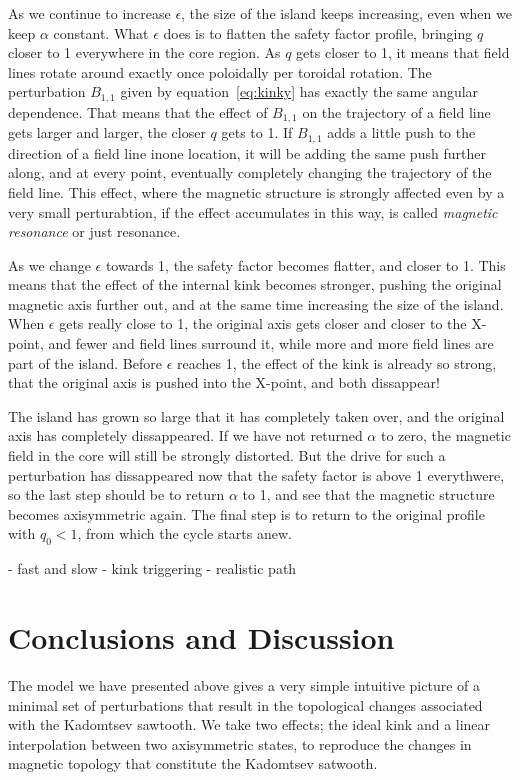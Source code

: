 \documentclass[%
superscriptaddress,
amsmath,amssymb,
aps,
pre,
floatfix,
]{revtex4-2}
\begin{document}
As we continue to increase  $\epsilon$, the size of the island keeps increasing, even when we keep $\alpha$ constant. 
What $\epsilon$ does is to flatten the safety factor profile, bringing $q$ closer to 1 everywhere in the core region.
As $q$ gets closer to 1, it means that field lines rotate around exactly once poloidally per toroidal rotation. 
The perturbation $B_{1,1}$ given by equation~\eqref{eq:kinky} has exactly the same angular dependence. 
That means that the effect of $B_{1,1}$ on the trajectory of a field line gets larger and larger, the closer $q$ gets to 1. 
If $B_{1,1}$ adds a little push to the direction of a field line inone location, it will be adding the same push further along, and at every point, eventually completely changing the trajectory of the field line. 
This effect, where the magnetic structure is strongly affected even by a very small perturabtion, if the effect accumulates in this way, is called \emph{magnetic resonance} or just resonance. 

As we change $\epsilon$ towards 1, the safety factor becomes flatter, and closer to 1. 
This means that the effect of the internal kink becomes stronger, pushing the original magnetic axis further out, and at the same time increasing the size of the island.
When $\epsilon$ gets really close to 1, the original axis gets closer and closer to the X-point, and fewer and field lines surround it, while more and more field lines are part of the island. 
Before $\epsilon$ reaches 1, the effect of the kink is already so strong, that the original axis is pushed into the X-point, and both dissappear!

The island has grown so large that it has completely taken over, and the original axis has completely dissappeared. 
If we have not returned $\alpha$ to zero, the magnetic field in the core will still be strongly distorted. 
But the drive for such a perturbation has dissappeared now that the safety factor is above 1 everythwere, so the last step should be to return $\alpha$ to 1, and see that the magnetic structure becomes axisymmetric again. 
The final step is to return to the original profile with $q_0<1$, from which the cycle starts anew. 

- fast and slow
- kink triggering
- realistic path

\section*{Conclusions and Discussion}
The model we have presented above gives a very simple intuitive picture of a minimal set of perturbations that result in the topological changes associated with the Kadomtsev sawtooth. 
We take two effects; the ideal kink and a linear interpolation between two axisymmetric states, to reproduce the changes in magnetic topology that constitute the Kadomtsev satwooth. 
\end{document}
